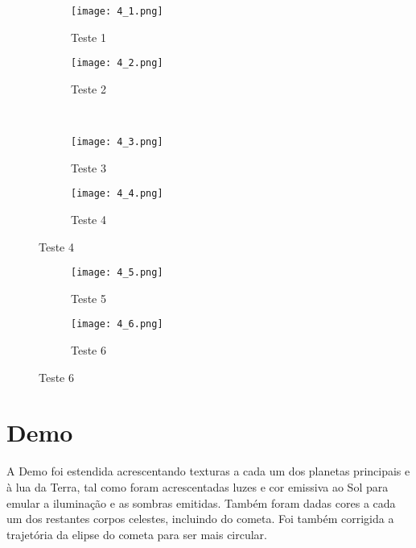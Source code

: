 \documentclass[14pt, a4 paper]{report}
\begin{document}
\begin{figure}[h]
    \centering
    \begin{subfigure}{.5\textwidth}
    \centering
    \texttt{[image: 4\_1.png]}
    \caption{Teste 1}
    \label{fig:sub1}
    \end{subfigure}%
    \begin{subfigure}{.5\textwidth}
    \centering
    \texttt{[image: 4\_2.png]}
    \caption{Teste 2}
    \label{fig:sub2}
    \end{subfigure}%
    \\
    \begin{subfigure}{.5\textwidth}
    \centering
    \texttt{[image: 4\_3.png]}
    \caption{Teste 3}
    \label{fig:sub3}
    \end{subfigure}%
    \begin{subfigure}{.5\textwidth}
    \centering
    \texttt{[image: 4\_4.png]}
    \caption{Teste 4}
    \label{fig:sub4}
    \end{subfigure}%
    \label{fig:2}
\end{figure}
\begin{figure}
    \begin{subfigure}{.5\textwidth}
    \centering
    \texttt{[image: 4\_5.png]}
    \caption{Teste 5}
    \label{fig:sub5}
    \end{subfigure}%
    \begin{subfigure}{.5\textwidth}
    \centering
    \texttt{[image: 4\_6.png]}
    \caption{Teste 6}
    \label{fig:sub6}
    \end{subfigure}%
    \label{fig:2}
\end{figure}

\section{Demo}

A Demo foi estendida acrescentando texturas a cada um dos planetas principais e à lua da Terra, tal como foram acrescentadas luzes e cor emissiva ao Sol para emular a iluminação e as sombras emitidas. Também foram dadas cores a cada um dos restantes corpos celestes, incluindo do cometa. Foi também corrigida a trajetória da elipse do cometa para ser mais circular.
\end{document}
